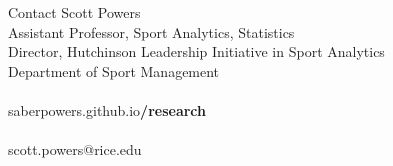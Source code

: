 \documentclass{beamer}
\begin{document}
  \begin{frame}{Contact}
    Scott Powers\\
    Assistant Professor, Sport Analytics, Statistics\\
    Director, Hutchinson Leadership Initiative in Sport Analytics\\
    Department of Sport Management\\
    ~\\
    saberpowers.github.io\alert{\bf /research}\\
    ~\\
    scott.powers@rice.edu
  \end{frame}

  
\end{document}
